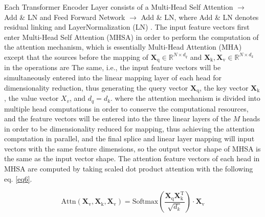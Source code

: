 Each Transformer Encoder Layer consists of a Multi-Head Self Attention $\to$ Add \& LN and Feed Forward Network $\to$ Add \& LN, where Add \& LN denotes residual linking and LayerNormalization (LN) \cite{1}. The input feature vectors first enter Multi-Head Self Attention (MHSA) in order to perform the computation of the attention mechanism, which is essentially Multi-Head Attention (MHA) except that the sources before the mapping of $\boldsymbol{X}_\text{q} \in \mathbb{R}^{N\times d_q}$ and $\boldsymbol{X}_\text{k}, \boldsymbol{X}_\text{v} \in \mathbb{R}^{N\times d_k }$ in the operations are The same, i.e., the input feature vectors will be simultaneously entered into the linear mapping layer of each head for dimensionality reduction, thus generating the query vector $\boldsymbol{X}_\text{q}$, the key vector $\boldsymbol{X}_\text{k}$, the value vector $X_v$, and $d_q = d_k$. where the attention mechanism is divided into multiple head computations in order to conserve the computational resources, and the feature vectors will be entered into the three linear layers of the $M$ heads in order to be dimensionality reduced for mapping, thus achieving the attention computation in parallel, and the final splice and linear layer mapping will input vectors with the same feature dimensions, so the output vector shape of MHSA is the same as the input vector shape. The attention feature vectors of each head in MHSA are computed by taking scaled dot product attention \cite{36} with the following eq. \ref{eq6}.

\begin{equation}
\label{eq6}
  \text{Attn}(\boldsymbol{X}_\text{v}, \boldsymbol{X}_\text{k}, \boldsymbol{X}_\text{v}) = \text{Softmax} \left( \frac{\boldsymbol{X}_\text{q}\boldsymbol{X}_\text{k}^\mathrm{T}}{\sqrt{d_k}} \right)\cdot \boldsymbol{X}_\text{v}
\end{equation}

